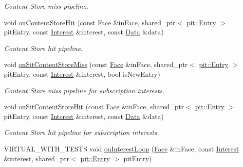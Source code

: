 \begin{DoxyCompactItemize}
\begin{DoxyCompactList}\small\item\em Content Store miss pipeline. \end{DoxyCompactList}\item 
void \hyperlink{classnfd_1_1Forwarder_a400f6dbb92d0885fa16b833d50838232}{on\+Content\+Store\+Hit} (const \hyperlink{classnfd_1_1Face}{Face} \&in\+Face, shared\+\_\+ptr$<$ \hyperlink{classnfd_1_1pit_1_1Entry}{pit\+::\+Entry} $>$ pit\+Entry, const \hyperlink{classndn_1_1Interest}{Interest} \&interest, const \hyperlink{classndn_1_1Data}{Data} \&data)\hypertarget{classnfd_1_1Forwarder_a400f6dbb92d0885fa16b833d50838232}{}\label{classnfd_1_1Forwarder_a400f6dbb92d0885fa16b833d50838232}

\begin{DoxyCompactList}\small\item\em Content Store hit pipeline. \end{DoxyCompactList}\item 
void \hyperlink{classnfd_1_1Forwarder_a5bd167dc057cd855dd155aefe43bb329}{on\+Sit\+Content\+Store\+Miss} (const \hyperlink{classnfd_1_1Face}{Face} \&in\+Face, shared\+\_\+ptr$<$ \hyperlink{classnfd_1_1pit_1_1Entry}{pit\+::\+Entry} $>$ pit\+Entry, const \hyperlink{classndn_1_1Interest}{Interest} \&interest, bool is\+New\+Entry)\hypertarget{classnfd_1_1Forwarder_a5bd167dc057cd855dd155aefe43bb329}{}\label{classnfd_1_1Forwarder_a5bd167dc057cd855dd155aefe43bb329}

\begin{DoxyCompactList}\small\item\em Content Store miss pipeline for subscription interests. \end{DoxyCompactList}\item 
void \hyperlink{classnfd_1_1Forwarder_a3868b1a88857bfecd365f6f1e85d4428}{on\+Sit\+Content\+Store\+Hit} (const \hyperlink{classnfd_1_1Face}{Face} \&in\+Face, shared\+\_\+ptr$<$ \hyperlink{classnfd_1_1pit_1_1Entry}{pit\+::\+Entry} $>$ pit\+Entry, const \hyperlink{classndn_1_1Interest}{Interest} \&interest, const \hyperlink{classndn_1_1Data}{Data} \&data)\hypertarget{classnfd_1_1Forwarder_a3868b1a88857bfecd365f6f1e85d4428}{}\label{classnfd_1_1Forwarder_a3868b1a88857bfecd365f6f1e85d4428}

\begin{DoxyCompactList}\small\item\em Content Store hit pipeline for subscription interests. \end{DoxyCompactList}\item 
V\+I\+R\+T\+U\+A\+L\+\_\+\+W\+I\+T\+H\+\_\+\+T\+E\+S\+TS void \hyperlink{classnfd_1_1Forwarder_a1efe0d456e49f46917e737441221fe26}{on\+Interest\+Loop} (\hyperlink{classnfd_1_1Face}{Face} \&in\+Face, const \hyperlink{classndn_1_1Interest}{Interest} \&interest, shared\+\_\+ptr$<$ \hyperlink{classnfd_1_1pit_1_1Entry}{pit\+::\+Entry} $>$ pit\+Entry)\hypertarget{classnfd_1_1Forwarder_a1efe0d456e49f46917e737441221fe26}{}\label{classnfd_1_1Forwarder_a1efe0d456e49f46917e737441221fe26}


\end{DoxyCompactItemize}
